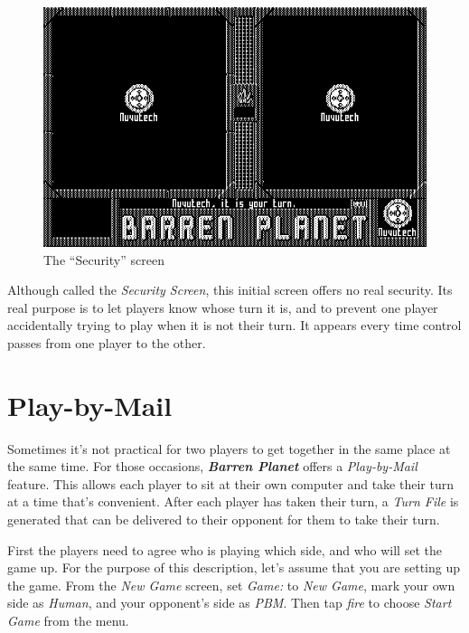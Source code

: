 \begin{figure}[h]
  \includegraphics[width=\textwidth]{security}
  \caption{The ``Security'' screen}
\end{figure}

Although called the {\it Security Screen}, this initial screen offers no real security. Its real purpose is to let players know whose turn it is, and to prevent one player accidentally trying to play when it is not their turn. It appears every time control passes from one player to the other.

\section{Play-by-Mail}

\noindent
Sometimes it's not practical for two players to get together in the same place at the same time. For those occasions, {\bf \it Barren Planet} offers a {\it Play-by-Mail} feature. This allows each player to sit at their own computer and take their turn at a time that's convenient. After each player has taken their turn, a {\it Turn File} is generated that can be delivered to their opponent for them to take their turn.

First the players need to agree who is playing which side, and who will set the game up. For the purpose of this description, let's assume that you are setting up the game. From the {\it New Game} screen, set {\it Game:} to {\it New Game}, mark your own side as {\it Human}, and your opponent's side as {\it PBM}. Then tap {\it fire} to choose {\it Start Game} from the menu.

